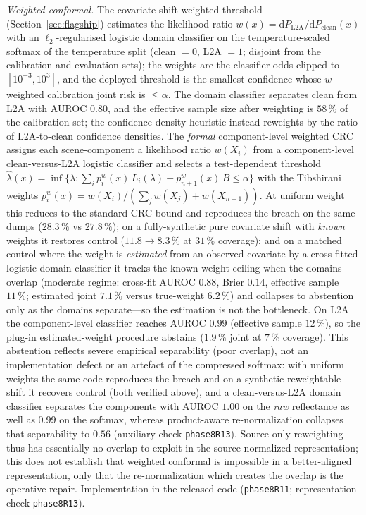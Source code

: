 \documentclass[preprint,3p,times]{elsarticle}
\begin{document}
\emph{Weighted conformal.} The covariate-shift weighted threshold (Section~\ref{sec:flagship}) estimates the likelihood ratio $w(x)=\mathrm{d}P_{\mathrm{L2A}}/\mathrm{d}P_{\mathrm{clean}}(x)$ with an $\ell_2$-regularised logistic domain classifier on the temperature-scaled softmax of the temperature split (clean $=0$, L2A $=1$; disjoint from the calibration and evaluation sets); the weights are the classifier odds clipped to $[10^{-3},10^{3}]$, and the deployed threshold is the smallest confidence whose $w$-weighted calibration joint risk is $\leq\alpha$. The domain classifier separates clean from L2A with AUROC $0.80$, and the effective sample size after weighting is $58\,\%$ of the calibration set; the confidence-density heuristic instead reweights by the ratio of L2A-to-clean confidence densities. The \emph{formal} component-level weighted CRC assigns each scene-component a likelihood ratio $w(X_i)$ from a component-level clean-versus-L2A logistic classifier and selects a test-dependent threshold $\hat\lambda(x)=\inf\{\lambda:\sum_i p^w_i(x)\,L_i(\lambda)+p^w_{n+1}(x)\,B\le\alpha\}$ with the Tibshirani weights $p^w_i(x)=w(X_i)/(\sum_j w(X_j)+w(X_{n+1}))$. At uniform weight this reduces to the standard CRC bound and reproduces the breach on the same dumps ($28.3\,\%$ vs $27.8\,\%$); on a fully-synthetic pure covariate shift with \emph{known} weights it restores control ($11.8\to8.3\,\%$ at $31\,\%$ coverage); and on a matched control where the weight is \emph{estimated} from an observed covariate by a cross-fitted logistic domain classifier it tracks the known-weight ceiling when the domains overlap (moderate regime: cross-fit AUROC $0.88$, Brier $0.14$, effective sample $11\,\%$; estimated joint $7.1\,\%$ versus true-weight $6.2\,\%$) and collapses to abstention only as the domains separate---so the estimation is not the bottleneck. On L2A the component-level classifier reaches AUROC $0.99$ (effective sample $12\,\%$), so the plug-in estimated-weight procedure abstains ($1.9\,\%$ joint at $7\,\%$ coverage). This abstention reflects severe empirical separability (poor overlap), not an implementation defect or an artefact of the compressed softmax: with uniform weights the same code reproduces the breach and on a synthetic reweightable shift it recovers control (both verified above), and a clean-versus-L2A domain classifier separates the components with AUROC $1.00$ on the \emph{raw} reflectance as well as $0.99$ on the softmax, whereas product-aware re-normalization collapses that separability to $0.56$ (auxiliary check \texttt{phase8R13}). Source-only reweighting thus has essentially no overlap to exploit in the source-normalized representation; this does not establish that weighted conformal is impossible in a better-aligned representation, only that the re-normalization which creates the overlap is the operative repair. Implementation in the released code (\texttt{phase8R11}; representation check \texttt{phase8R13}).
\end{document}
